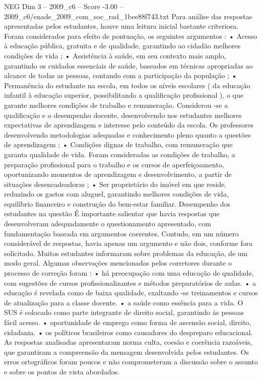 \begin{textsample}{NEG Dim 3 – 2009\_c6 – Score -3.00 – 2009\_c6/enade\_2009\_com\_soc\_rad\_1bee88f743.txt}
Para análise das respostas apresentadas pelos estudantes, houve uma leitura inicial bastante criteriosa.
Foram considerados para efeito de pontuação, os seguintes argumentos : • Acesso à educação pública, gratuita e de qualidade, garantindo ao cidadão melhores condições de vida ; • Assistência à saúde, em seu contexto mais amplo, garantindo os cuidados essenciais de saúde, baseados em técnicas apropriadas ao alcance de todas as pessoas, contando com a participação da população ; • Permanência do estudante na escola, em todos os níveis escolares ( da educação infantil à educação superior, possibilitando a qualificação profissional ), o que garante melhores condições de trabalho e remuneração.
Considerou -se a qualificação e o desempenho docente, desenvolvendo nos estudantes melhores expectativas de aprendizagem e interesse pelo conteúdo da escola.
Os professores desenvolvendo metodologias adequadas e conhecimento pleno quanto a questões de aprendizagem ; • Condições dignas de trabalho, com remuneração que garanta qualidade de vida.
Foram consideradas as condições de trabalho, a preparação profissional para o trabalho e os cursos de aperfeiçoamento, oportunizando momentos de aprendizagem e desenvolvimento, a partir de situações desencadeadoras ; • Ser proprietário do imóvel em que reside, reduzindo os gastos com aluguel, garantindo melhores condições de vida, equilíbrio financeiro e construção do bem-estar familiar.
Desempenho dos estudantes na questão É importante salientar que havia respostas que desenvolveram adequadamente o questionamento apresentado, com fundamentação baseada em argumentos coerentes.
Contudo, em um número considerável de respostas, havia apenas um argumento e não dois, conforme fora solicitado.
Muitos estudantes informaram sobre problemas da educação, de um modo geral.
Algumas observações mencionadas pelos corretores durante o processo de correção foram : • há preocupação com uma educação de qualidade, com sugestões de cursos profissionalizantes e métodos preparatórios de aulas. • a educação é revelada como de baixa qualidade, exaltando -se treinamentos e cursos de atualização para a classe docente. • a saúde como essência para a vida.
O SUS é colocado como parte integrante de direito social, garantindo às pessoas fácil acesso. • oportunidade de emprego como forma de ascensão social, direito, cidadania. • os políticos brasileiros como causadores do despreparo educacional.
As respostas analisadas apresentaram norma culta, coesão e coerência razoáveis, que garantiram a compreensão da mensagem desenvolvida pelos estudantes.
Os erros ortográficos foram poucos e não comprometeram a discussão sobre o assunto e sobre os pontos de vista abordados.

\end{textsample}
